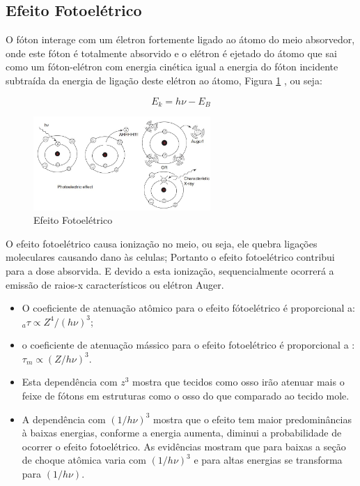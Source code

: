 \documentclass[11pt,a4paper]{article}
\begin{document}
        \subsection{Efeito Fotoelétrico}

            O fóton interage com um életron fortemente ligado ao átomo do meio absorvedor, onde este fóton é totalmente absorvido e o elétron é ejetado do átomo que sai como um fóton-elétron com energia cinética igual a energia do fóton incidente subtraída da energia de ligação deste elétron ao átomo, Figura \ref{fig:efeitoFotoeletrico} , ou seja:



                \begin{equation}
                    E_k = h\nu - E_B
                \end{equation}

                \begin{figure}[h]
                    \centering
                    \includegraphics[width=0.6\textwidth]{Imagens/efeitoFotoeletrico.JPG}
                    \caption{Efeito Fotoelétrico}
                    \label{fig:efeitoFotoeletrico}
                \end{figure}

                O efeito fotoelétrico causa ionização no meio, ou seja, ele quebra ligações moleculares causando dano às celulas; Portanto o efeito fotoelétrico contribui para a dose absorvida. E devido a esta ionização, sequencialmente ocorrerá a emissão de raios-x característicos ou elétron Auger.

            \begin{itemize}
                \item O coeficiente de atenuação atômico para o efeito fótoelétrico é proporcional a: ${}_a\tau \propto Z^4 / (h\nu)^3$;
                \item o coeficiente de atenuação mássico para o efeito fotoelétrico é proporcional a
                : $\tau_m \propto (Z / h\nu)^3$. 
                \item Esta dependência com $z^3$ mostra que tecidos como osso irão atenuar mais o feixe de fótons em estruturas como o osso do que comparado ao tecido mole. 
                \item A dependência com $(1 / h\nu)^3$ mostra que o efeito tem maior predominâncias à baixas energias, conforme a energia aumenta, diminui a probabilidade de ocorrer o efeito fotoelétrico. As evidências mostram que para baixas a seção de choque atômica varia com $(1 / h\nu)^3$ e para altas energias se transforma para $(1 / h\nu)$. 
            \end{itemize}
\end{document}
